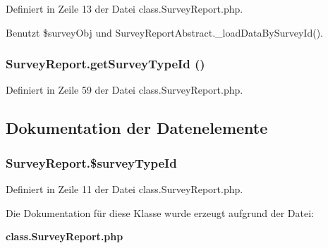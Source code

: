 Definiert in Zeile 13 der Datei class.SurveyReport.php.

Benutzt \$surveyObj und SurveyReportAbstract.\_\-loadDataBySurveyId().
\subsubsection{\setlength{\rightskip}{0pt plus 5cm}SurveyReport.getSurveyTypeId ()}\label{classSurveyReport_e607b33b228b1b449c7cf42e8415e313}




Definiert in Zeile 59 der Datei class.SurveyReport.php.

\subsection{Dokumentation der Datenelemente}
\subsubsection{\setlength{\rightskip}{0pt plus 5cm}SurveyReport.\$surveyTypeId}\label{classSurveyReport_8afa69a6b9d08fe6b916dd68269900c9}




Definiert in Zeile 11 der Datei class.SurveyReport.php.

Die Dokumentation für diese Klasse wurde erzeugt aufgrund der Datei:\begin{CompactItemize}
\item 
{\bf class.SurveyReport.php}\end{CompactItemize}
